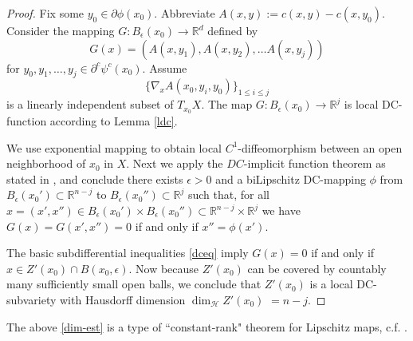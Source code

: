 \documentclass[12pt]{amsart}
\theoremstyle{definition}
\theoremstyle{remark}
\newcommand{\bR}{\mathbb{R}}
\newcommand{\del}{\partial}
\newcommand{\cd}{c_\Delta}
\begin{document}
 

\begin{proof} 
Fix some $y_0\in \del \phi(x_0)$. Abbreviate $A(x,y):=c(x,y)-c(x,y_0)$. Consider the mapping $G: B_\epsilon(x_0) \to \bR^d$ defined by $$G(x)= (A(x,y_1), A(x,y_2), \ldots A(x,y_j)) $$ for $y_0, y_1, \ldots, y_j \in \del^c \psi^c(x_0)$. Assume $$\{\nabla_x  A(x_0,y_i, y_0)\}_{1 \leq i \leq j}$$ is a linearly independent subset of $T_{x_0} X$. The map $G:B_\epsilon(x_0) \to \bR^j$ is local DC-function according to Lemma \ref{ldc}. 

We use exponential mapping to obtain local $C^1$-diffeomorphism between an open neighborhood of $x_0$ in $X$. Next we apply the $DC$-implicit function theorem as stated in \cite[Thm 3.8]{KitMc}, and conclude there exists $\epsilon>0$ and a biLipschitz DC-mapping $\phi$ from $B_\epsilon(x_0') \subset \bR^{n-j}$ to $B_\epsilon(x_0'') \subset \bR^j$ such that, for all $x=(x', x'') \in  B_\epsilon(x_0') \times B_\epsilon(x_0'') \subset \bR^{n-j} \times \bR^j$ we have $G(x)=G(x',x'')=0$ if and only if $x''=\phi(x')$. 

The basic subdifferential inequalities \eqref{dceq} imply $G(x)=0$ if and only if $x\in Z'(x_0) \cap B(x_0,\epsilon)$. Now because $Z'(x_0)$ can be covered by countably many sufficiently small open balls, we conclude that $Z'(x_0)$ is a local DC-subvariety with Hausdorff dimension $\dim_{\mathscr{H}} Z'(x_0)$ $=n-j$. 
\end{proof}

The above \ref{dim-est} is a type of ``constant-rank" theorem for Lipschitz maps, c.f. \cite{clarke1976inverse}.



\end{document}

